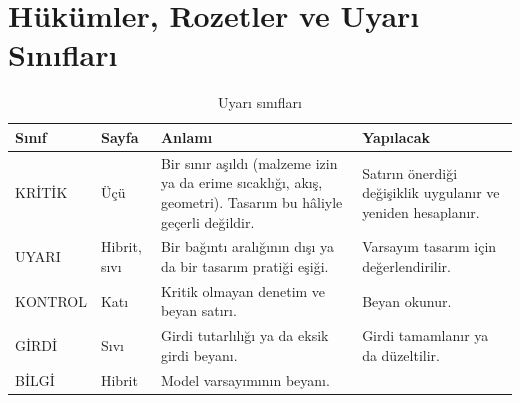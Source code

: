 \documentclass[11pt,a4paper]{article}
\newcommand{\ui}[1]{\textsf{#1}}
\begin{document}
\section{Hükümler, Rozetler ve Uyarı Sınıfları}\label{sec:hukumler}

\begin{table}[htbp]
\centering\small
\caption{Uyarı sınıfları}\label{tab:siddet}
\begin{tabular}{@{}>{\raggedright\arraybackslash}p{2.6cm}>{\raggedright\arraybackslash}p{2.6cm}>{\raggedright\arraybackslash}p{5.6cm}>{\raggedright\arraybackslash}p{4.8cm}@{}}
\toprule
\textbf{Sınıf} & \textbf{Sayfa} & \textbf{Anlamı} & \textbf{Yapılacak} \\
\midrule
\ui{KRİTİK} & Üçü & Bir sınır aşıldı (malzeme izin ya da erime sıcaklığı, akış, geometri). Tasarım bu hâliyle geçerli değildir. & Satırın önerdiği değişiklik uygulanır ve yeniden hesaplanır. \\
\ui{UYARI} & Hibrit, sıvı & Bir bağıntı aralığının dışı ya da bir tasarım pratiği eşiği. & Varsayım tasarım için değerlendirilir. \\
\ui{KONTROL} & Katı & Kritik olmayan denetim ve beyan satırı. & Beyan okunur. \\
\ui{GİRDİ} & Sıvı & Girdi tutarlılığı ya da eksik girdi beyanı. & Girdi tamamlanır ya da düzeltilir. \\
\ui{BİLGİ} & Hibrit & Model varsayımının beyanı. & \\
\bottomrule
\end{tabular}
\end{table}
\end{document}
